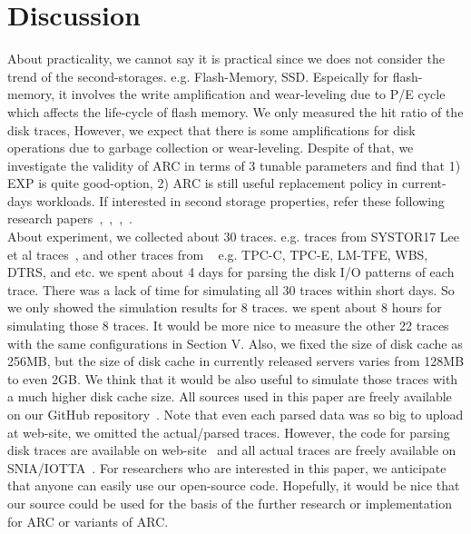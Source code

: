 \section{Discussion}

About practicality, we cannot say it is practical since we does not consider the trend of the second-storages. e.g. Flash-Memory, SSD. Espeically for flash-memory, it involves the write amplification and wear-leveling due to P/E cycle which affects the life-cycle of flash memory. We only measured the hit ratio of the disk traces, However, we expect that there is some amplifications for disk operations due to garbage collection or wear-leveling. Despite of that, we investigate the validity of ARC in terms of 3 tunable parameters and find that 1) EXP is quite good-option, 2) ARC is still useful replacement policy in current-days workloads. If interested in second storage properties, refer these following research papers~\cite{ssd1},~\cite{ssd2},~\cite{cflru},~\cite{flash}.\\
About experiment, we collected about 30 traces. e.g. traces from SYSTOR17 Lee et al traces~\cite{systor17}, and other traces from ~\cite{microsoft} e.g. TPC-C, TPC-E, LM-TFE, WBS, DTRS, and etc. we spent about 4 days for parsing the disk I/O patterns of each trace. There was a lack of time for simulating all 30 traces within short days. So we only showed the simulation results for 8 traces. we spent about 8 hours for simulating those 8 traces. It would be more nice to measure the other 22 traces with the same configurations in Section V. Also, we fixed the size of disk cache as 256MB, but the size of disk cache in currently released servers varies from 128MB to even 2GB. We think that it would be also useful to simulate those traces with a much higher disk cache size. All sources used in this paper are freely available on our GitHub repository~\cite{opensource}. Note that even each parsed data was so big to upload at web-site, we omitted the actual/parsed traces. However, the code for parsing disk traces are available on web-site~\cite{opensource} and all actual traces are freely available on SNIA/IOTTA~\cite{snia}. For researchers who are interested in this paper, we anticipate that anyone can easily use our open-source code. Hopefully, it would be nice that our source could be used for the basis of the further research or implementation for ARC or variants of ARC.

